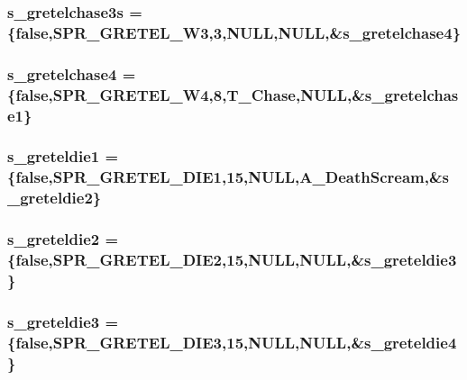 \label{WL__ACT2_8C_a6706248520f9e3ccae440f57e44ab6a1}
\hypertarget{WL__ACT2_8C_ae2db03c8048b00b403283fa9457d2a8c}{
\subsubsection[{s\_\-gretelchase3s}]{ {\bf s\_\-gretelchase3s} = \{false,SPR\_\-GRETEL\_\-W3,3,NULL,NULL,\&{\bf s\_\-gretelchase4}\}}}
\label{WL__ACT2_8C_ae2db03c8048b00b403283fa9457d2a8c}
\hypertarget{WL__ACT2_8C_af804f015551047b0346655fbc9d28a69}{
\subsubsection[{s\_\-gretelchase4}]{ {\bf s\_\-gretelchase4} = \{false,SPR\_\-GRETEL\_\-W4,8,T\_\-Chase,NULL,\&{\bf s\_\-gretelchase1}\}}}
\label{WL__ACT2_8C_af804f015551047b0346655fbc9d28a69}
\hypertarget{WL__ACT2_8C_ad13ff510f50e05b58f44d971b4b0bf7c}{
\subsubsection[{s\_\-greteldie1}]{ {\bf s\_\-greteldie1} = \{false,SPR\_\-GRETEL\_\-DIE1,15,NULL,A\_\-DeathScream,\&{\bf s\_\-greteldie2}\}}}
\label{WL__ACT2_8C_ad13ff510f50e05b58f44d971b4b0bf7c}
\hypertarget{WL__ACT2_8C_a06256ecf09ec98967b9202803aac9db8}{
\subsubsection[{s\_\-greteldie2}]{ {\bf s\_\-greteldie2} = \{false,SPR\_\-GRETEL\_\-DIE2,15,NULL,NULL,\&{\bf s\_\-greteldie3}\}}}
\label{WL__ACT2_8C_a06256ecf09ec98967b9202803aac9db8}
\hypertarget{WL__ACT2_8C_acd062dec778f9e003bd1922935d3e802}{
\subsubsection[{s\_\-greteldie3}]{ {\bf s\_\-greteldie3} = \{false,SPR\_\-GRETEL\_\-DIE3,15,NULL,NULL,\&{\bf s\_\-greteldie4}\}}}
